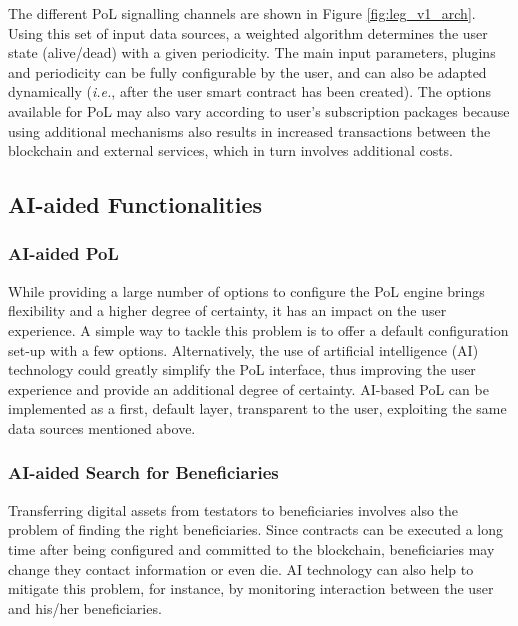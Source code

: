 The different PoL signalling channels are shown in Figure \ref{fig:leg_v1_arch}. Using this set of input data sources, a weighted algorithm determines the user state (alive/dead) with a given periodicity. The main input parameters, plugins and periodicity can be fully configurable by the user, and can also be adapted dynamically (\textit{i.e.}, after the user smart contract has been created). The options available for PoL may also vary according to user’s subscription packages because using additional mechanisms also results in increased transactions between the blockchain and external services, which in turn involves additional costs. 


\subsection{AI-aided Functionalities} %
\label{sub:ai_aided_functionalities}


\subsubsection{AI-aided PoL} %
\label{ssub:ai_based_pol}

While providing a large number of options to configure the PoL engine brings flexibility and a higher degree of certainty, it has an impact on the user experience. A simple way to tackle this problem is to offer a default configuration set-up with a few options. Alternatively, the use of artificial intelligence (AI) technology could greatly simplify the PoL interface, thus improving the user experience and provide an additional degree of certainty. AI-based PoL can be implemented as a first, default layer, transparent to the user, exploiting the same data sources mentioned above.


\subsubsection{AI-aided Search for Beneficiaries} %
\label{ssub:ai_aided_search_for_beneficiaries}
Transferring digital assets from testators to beneficiaries involves also the problem of finding the right beneficiaries. Since contracts can be executed a long time after being configured and committed to the blockchain, beneficiaries may change they contact information or even die. 
AI technology can also help to mitigate this problem, for instance, by monitoring interaction between the user and his/her beneficiaries.

